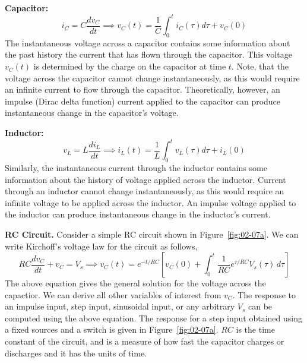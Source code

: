\noindent\textbf{Capacitor:}
\begin{equation}
    i_C = C \frac{dv_C}{dt} \implies v_C\left(t\right) = \frac{1}{C}\int_{0}^{t} i_C\left(\tau\right) d\tau + v_C\left(0\right)
    \label{eq:02-26}
\end{equation} 
The instantaneous voltage across a capacitor contains some information about the past history the current that has flown through the capacitor. This voltage $v_C\left(t\right)$ is determined by the charge on the capacitor at time $t$. Note, that the voltage across the capacitor cannot change instantaneously, as this would require an infinite current to flow through the capacitor. Theoretically, however, an impulse (Dirac delta function) current applied to the capacitor can produce instantaneous change in the capacitor's voltage.

\noindent\textbf{Inductor:}
\begin{equation}
    v_L = L \frac{di_L}{dt} \implies i_L\left(t\right) = \frac{1}{L}\int_{0}^{t} v_L\left(\tau\right) d\tau + i_L\left(0\right)
    \label{eq:02-27}
\end{equation}
Similarly, the instantaneous current through the inductor contains some information about the history of voltage applied across the inductor. Current through an inductor cannot change instantaneously, as this would require an infinite voltage to be applied across the inductor. An impulse voltage applied to the inductor can produce instantaneous change in the inductor's current.

\noindent\textbf{RC Circuit.} Consider a simple RC circuit shown in Figure~\ref{fig:02-07a}. We can write Kirchoff's voltage law for the circuit as follows,
\begin{equation}
    RC \frac{d v_C}{dt} + v_C = V_s \implies v_C(t) = e^{-t/RC} \left[ v_{C}(0) + \int_0^t \frac{1}{RC} e^{\tau/RC} V_s(\tau)\, d\tau \right]
    \label{eq:02-28}
\end{equation}
The above equation gives the general solution for the voltage across the capactior. We can derive all other variables of interest from $v_C$. The response to an impulse input, step input, sinusoidal input, or any arbitrary $V_s$ can be computed using the above equation. The response for a step input obtained using a fixed sources and a switch is given in Figure~\ref{fig:02-07a}. $RC$ is the time constant of the circuit, and is a measure of how fast the capacitor charges or discharges and it has the units of time.

